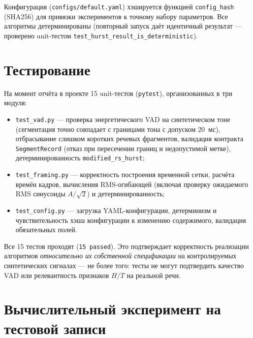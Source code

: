 \documentclass[12pt,a4paper]{article}
\begin{document}
Конфигурация (\texttt{configs/default.yaml}) хэшируется функцией
\texttt{config\_hash} (SHA256) для привязки экспериментов к точному набору
параметров. Все алгоритмы детерминированы (повторный запуск даёт идентичный
результат — проверено unit-тестом
\texttt{test\_hurst\_result\_is\_deterministic}).

\section{Тестирование}

На момент отчёта в проекте 15 unit-тестов (\texttt{pytest}), организованных
в три модуля:

\begin{itemize}
  \item \texttt{test\_vad.py} — проверка энергетического VAD на синтетическом
   тоне (сегментация точно совпадает с границами тона с допуском 20~мс),
   отбрасывание слишком коротких речевых фрагментов, валидация контракта
   \texttt{SegmentRecord} (отказ при пересечении границ и недопустимой
   метке), детерминированность \texttt{modified\_rs\_hurst};
  \item \texttt{test\_framing.py} — корректность построения временной сетки,
   расчёта времён кадров, вычисления RMS-огибающей (включая проверку
   ожидаемого RMS синусоиды $A/\sqrt2$) и детерминированность;
  \item \texttt{test\_config.py} — загрузка YAML-конфигурации, детерминизм и
   чувствительность хэша конфигурации к изменению содержимого, валидация
   обязательных полей.
\end{itemize}

Все 15 тестов проходят (\texttt{15 passed}). Это подтверждает корректность
реализации алгоритмов \emph{относительно их собственной спецификации} на
контролируемых синтетических сигналах — не более того: тесты не могут
подтвердить качество VAD или релевантность признаков $H/T$ на реальной речи.

\section{Вычислительный эксперимент на тестовой записи}
\label{sec:experiment}
\end{document}
